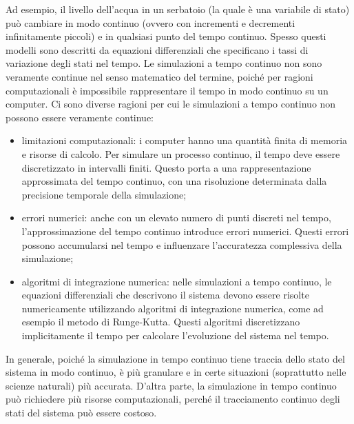 \documentclass[12pt,a4paper,openright,twoside]{book}
\begin{document}
Ad esempio, il livello dell'acqua in un serbatoio (la quale è una variabile di stato) può cambiare in modo continuo (ovvero con incrementi e decrementi infinitamente piccoli) e in qualsiasi punto del tempo continuo. Spesso questi modelli sono descritti da equazioni differenziali che specificano i tassi di variazione degli stati nel tempo.
Le simulazioni a tempo continuo non sono veramente continue nel senso matematico del termine, poiché per ragioni computazionali è impossibile rappresentare il tempo in modo continuo su un computer.
Ci sono diverse ragioni per cui le simulazioni a tempo continuo non possono essere veramente continue:
\begin{itemize}
    \item limitazioni computazionali: i computer hanno una quantità finita di memoria e risorse di calcolo. Per simulare un processo continuo, il tempo deve essere discretizzato in intervalli finiti. Questo porta a una rappresentazione approssimata del tempo continuo, con una risoluzione determinata dalla precisione temporale della simulazione;
    \item errori numerici: anche con un elevato numero di punti discreti nel tempo, l'approssimazione del tempo continuo introduce errori numerici. Questi errori possono accumularsi nel tempo e influenzare l'accuratezza complessiva della simulazione;
    \item algoritmi di integrazione numerica: nelle simulazioni a tempo continuo, le equazioni differenziali che descrivono il sistema devono essere risolte numericamente utilizzando algoritmi di integrazione numerica, come ad esempio il metodo di Runge-Kutta. Questi algoritmi discretizzano implicitamente il tempo per calcolare l'evoluzione del sistema nel tempo.
\end{itemize}

In generale, poiché la simulazione in tempo continuo tiene traccia dello stato del sistema in modo continuo, è più granulare e in certe situazioni (soprattutto nelle scienze naturali) più accurata. D'altra parte, la simulazione in tempo continuo può richiedere più risorse computazionali, perché il tracciamento continuo degli stati del sistema può essere costoso.
\end{document}
